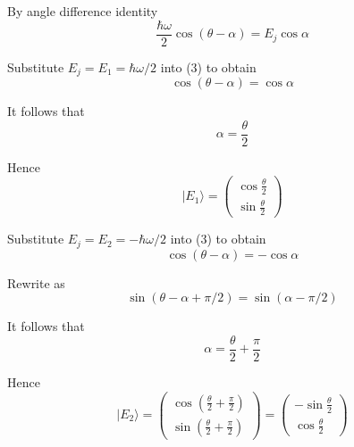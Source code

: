 \documentclass[12pt]{article}
\begin{document}
By angle difference identity
\begin{equation*}
\frac{\hbar\omega}{2}\cos(\theta-\alpha)=E_j\cos\alpha
\tag{3}
\end{equation*}

Substitute $E_j=E_1=\hbar\omega/2$ into (3) to obtain
\begin{equation*}
\cos(\theta-\alpha)=\cos\alpha
\end{equation*}

It follows that
\begin{equation*}
\alpha=\frac{\theta}{2}
\end{equation*}

Hence
\begin{equation*}
|E_1\rangle=\begin{pmatrix}\cos\frac{\theta}{2}\\[1ex]\sin\frac{\theta}{2}\end{pmatrix}
\end{equation*}

Substitute $E_j=E_2=-\hbar\omega/2$ into (3) to obtain
\begin{equation*}
\cos(\theta-\alpha)=-\cos\alpha
\end{equation*}

Rewrite as
\begin{equation*}
\sin(\theta-\alpha+\pi/2)=\sin(\alpha-\pi/2)
\end{equation*}

It follows that
\begin{equation*}
\alpha=\frac{\theta}{2}+\frac{\pi}{2}
\end{equation*}

Hence
\begin{equation*}
|E_2\rangle=\begin{pmatrix}\cos\left(\frac{\theta}{2}+\frac{\pi}{2}\right)
\\[1ex]
\sin\left(\frac{\theta}{2}+\frac{\pi}{2}\right)
\end{pmatrix}
=\begin{pmatrix}
-\sin\frac{\theta}{2}
\\[1ex]
\cos\frac{\theta}{2}
\end{pmatrix}
\end{equation*}
\end{document}
